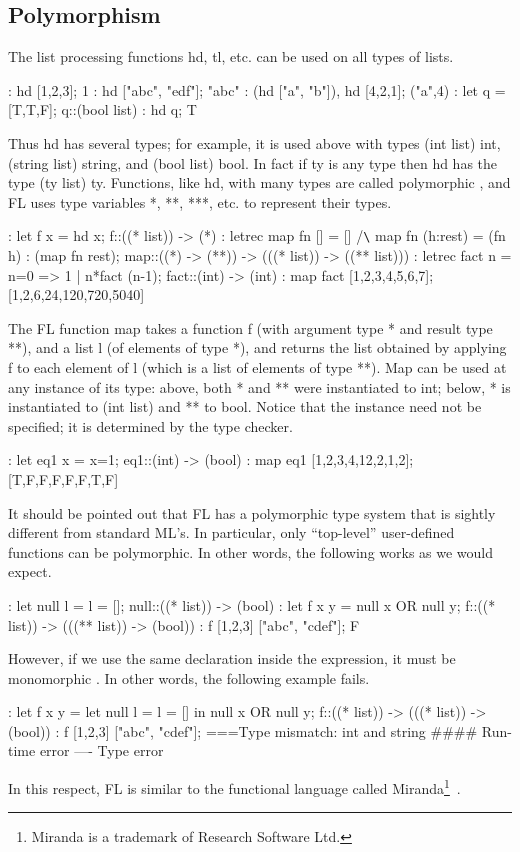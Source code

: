 \subsection{Polymorphism}

The list processing functions hd, tl, etc. can be used on all types of lists.
\begin{hol}
: hd [1,2,3];
1
: hd ["abc", "edf"];
"abc"
: (hd ["a", "b"]), hd [4,2,1];
("a",4)
: let q = [T,T,F];
q::(bool list)
: hd q;
T
\end{hol}
Thus hd has several types; for example, it is used above with types
(int list) \funarrow int,
(string list) \funarrow string, and (bool list) \funarrow bool.
In fact if ty is any type then hd has the type (ty list) \funarrow ty.
Functions, like hd, with many types are called polymorphic%
%
{},
and FL uses type variables%
%
{} *, **, ***, etc. to represent their types.
\begin{hol}
: let f x = hd x;
f::((* list)) -> (*)
: letrec map fn [] = []
   /\verb!\!    map fn (h:rest) = (fn h) : (map fn rest);
map::((*) -> (**)) -> (((* list)) -> ((** list)))
: letrec fact n = n=0 => 1 | n*fact (n-1);
fact::(int) -> (int)
: map fact [1,2,3,4,5,6,7];
[1,2,6,24,120,720,5040]
\end{hol}
The FL function map%
%
{} takes a function f (with argument type * and result
type **), and a list l
(of elements of type *), and returns the list obtained by applying
f to each element of l
(which is a list of elements of type **). Map can be used at any instance
of its type: above, both *
and ** were instantiated to int; below, * is instantiated to (int list)
and ** to bool. Notice that the
instance need  not be  specified; it is determined by the type checker.
\begin{hol}
: let eq1 x = x=1;
eq1::(int) -> (bool)
: map eq1 [1,2,3,4,12,2,1,2];
[T,F,F,F,F,F,T,F]
\end{hol}

It should be pointed out that FL has a polymorphic type system that
is sightly different from
standard ML's. In particular, only ``top-level'' user-defined functions
can be polymorphic. In
other words, the following works as we would expect.
\begin{hol}
: let null l = l = [];
null::((* list)) -> (bool)
: let f x y = null x OR null y;
f::((* list)) -> (((** list)) -> (bool))
: f [1,2,3] ["abc", "cdef"];
F
\end{hol}
However, if we use the same declaration inside the expression, it must
be monomorphic%
%
{}. In other
words, the following example fails.
\begin{hol}
: let f x y =
    let null l = l = [] in
    null x OR null y;
f::((* list)) -> (((* list)) -> (bool))
: f [1,2,3] ["abc", "cdef"];
===Type mismatch: int and string
#### Run-time error
---- Type error
\end{hol}
In this respect, FL is similar to the functional language called
Miranda\footnote{Miranda is a trademark of
Research Software Ltd.}~\cite{Miranda}.

